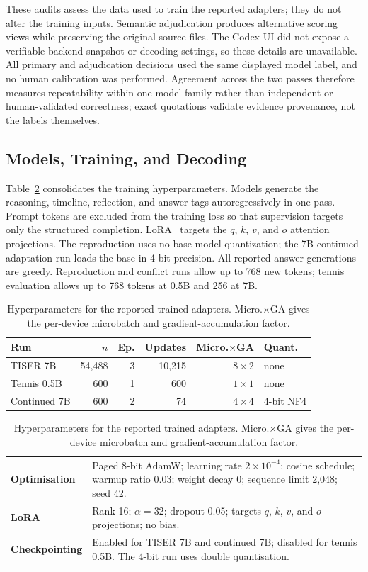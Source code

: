 \documentclass[conference]{IEEEtran}
\begin{document}
These audits assess the data used to train the reported adapters; they do not alter the training inputs. Semantic adjudication produces alternative scoring views while preserving the original source files. The Codex UI did not expose a verifiable backend snapshot or decoding settings, so these details are unavailable. All primary and adjudication decisions used the same displayed model label, and no human calibration was performed. Agreement across the two passes therefore measures repeatability within one model family rather than independent or human-validated correctness; exact quotations validate evidence provenance, not the labels themselves.

\subsection{Models, Training, and Decoding}

Table~\ref{tab:settings} consolidates the training hyperparameters. Models generate the reasoning, timeline, reflection, and answer tags autoregressively in one pass. Prompt tokens are excluded from the training loss so that supervision targets only the structured completion. LoRA~\cite{hu2022lora} targets the $q$, $k$, $v$, and $o$ attention projections. The reproduction uses no base-model quantization; the 7B continued-adaptation run loads the base in 4-bit precision. All reported answer generations are greedy. Reproduction and conflict runs allow up to 768 new tokens; tennis evaluation allows up to 768 tokens at 0.5B and 256 at 7B.

\begin{table}[t]
\centering
\caption{Hyperparameters for the reported trained adapters. Micro.$\times$GA gives the per-device microbatch and gradient-accumulation factor.}
\label{tab:settings}
\setlength{\tabcolsep}{2.3pt}
{\footnotesize
\begin{tabular}{lrrrrl}
\toprule
\textbf{Run} & \textbf{$n$} & \textbf{Ep.} & \textbf{Updates} & \textbf{Micro.$\times$GA} & \textbf{Quant.} \\
\midrule
TISER 7B & 54{,}488 & 3 & 10{,}215 & $8{\times}2$ & none \\
Tennis 0.5B & 600 & 1 & 600 & $1{\times}1$ & none \\
Continued 7B & 600 & 2 & 74 & $4{\times}4$ & 4-bit NF4 \\
\bottomrule
\end{tabular}

\vspace{0.4em}
\begin{tabular}{@{}lp{}@{}}
\textbf{Optimisation} & Paged 8-bit AdamW; learning rate $2{\times}10^{-4}$; cosine schedule; warmup ratio 0.03; weight decay 0; sequence limit 2,048; seed 42. \\
\textbf{LoRA} & Rank 16; $\alpha=32$; dropout 0.05; targets $q$, $k$, $v$, and $o$ projections; no bias. \\
\textbf{Checkpointing} & Enabled for TISER 7B and continued 7B; disabled for tennis 0.5B. The 4-bit run uses double quantisation. \\
\end{tabular}
}
\end{table}
\end{document}
